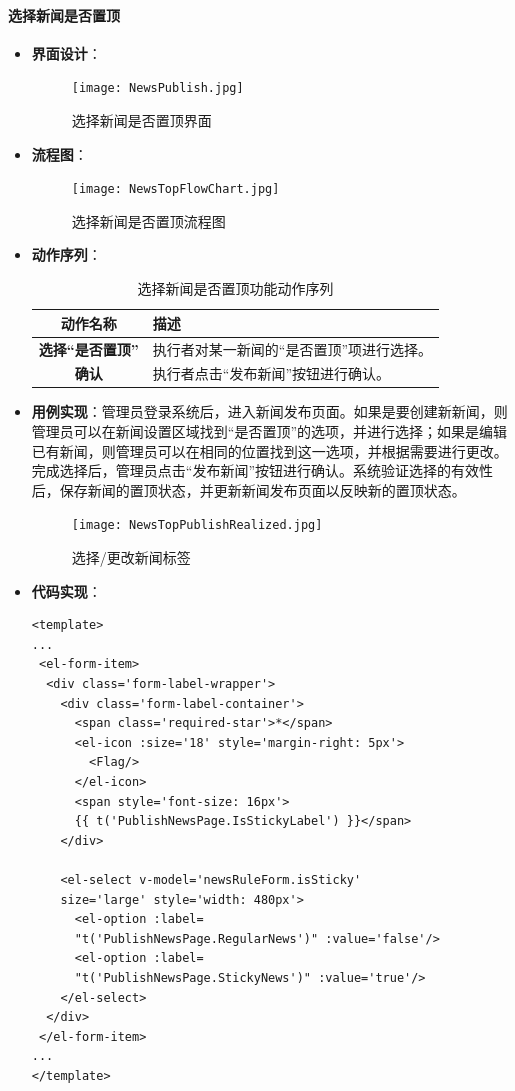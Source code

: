 \paragraph{选择新闻是否置顶}
\begin{itemize}
	\item \textbf{界面设计}：
	\begin{figure}[H]
		\centering
		\texttt{[image: NewsPublish.jpg]}
		\caption{选择新闻是否置顶界面}
		\label{NewsPublish}
	\end{figure}
	\item \textbf{流程图}：
	\begin{figure}[H]
		\centering
		\texttt{[image: NewsTopFlowChart.jpg]}
		\caption{选择新闻是否置顶流程图}
		\label{NewsTopFlowChart}
	\end{figure}
	\item \textbf{动作序列}：
	\begin{table}[H]
		\centering
		\caption{选择新闻是否置顶功能动作序列}
		\renewcommand\arraystretch{1.5}
		\begin{tabular}{|c|>{\raggedright\arraybackslash}p{10cm}|}
			\hline
			\textbf{动作名称} & \textbf{描述} \\ \hline
			\textbf{选择“是否置顶”} & 执行者对某一新闻的“是否置顶”项进行选择。 \\ \hline
			\textbf{确认} & 执行者点击“发布新闻”按钮进行确认。 \\ \hline
		\end{tabular}
	\end{table}
	\item \textbf{用例实现}：管理员登录系统后，进入新闻发布页面。如果是要创建新新闻，则管理员可以在新闻设置区域找到“是否置顶”的选项，并进行选择；如果是编辑已有新闻，则管理员可以在相同的位置找到这一选项，并根据需要进行更改。完成选择后，管理员点击“发布新闻”按钮进行确认。系统验证选择的有效性后，保存新闻的置顶状态，并更新新闻发布页面以反映新的置顶状态。
	\begin{figure}[H]
		\centering
		\texttt{[image: NewsTopPublishRealized.jpg]}
		\caption{选择/更改新闻标签}
		\label{NewsTopPublishRealized}
	\end{figure}
	\item \textbf{代码实现}：
	\begin{verbatim}
<template>
...
 <el-form-item>
  <div class='form-label-wrapper'>
    <div class='form-label-container'>
      <span class='required-star'>*</span>
      <el-icon :size='18' style='margin-right: 5px'>
        <Flag/>
      </el-icon>
      <span style='font-size: 16px'>
      {{ t('PublishNewsPage.IsStickyLabel') }}</span>
    </div>
	
    <el-select v-model='newsRuleForm.isSticky' 
    size='large' style='width: 480px'>
      <el-option :label=
      "t('PublishNewsPage.RegularNews')" :value='false'/>
      <el-option :label=
      "t('PublishNewsPage.StickyNews')" :value='true'/>
    </el-select>
  </div>
 </el-form-item>
...
</template>
	\end{verbatim}
\end{itemize}

